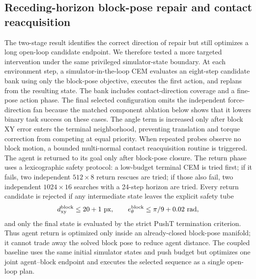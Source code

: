\documentclass{article}
\begin{document}
\subsection{Receding-horizon block-pose repair and contact reacquisition}
\label{sec:supp-receding-block-pose-repair}

The two-stage result identifies the correct direction of repair but still
optimizes a long open-loop candidate endpoint.  We therefore tested a more
targeted intervention under the same privileged simulator-state boundary.  At
each environment step, a simulator-in-the-loop CEM evaluates an eight-step
candidate bank using only the block-pose objective, executes the first action,
and replans from the resulting state.  The bank includes contact-direction
coverage and a fine-pose action phase.  The final selected configuration omits
the independent force-direction fan because the matched component ablation
below shows that it lowers binary task success on these cases.  The angle term
is increased only after block XY error enters the terminal neighborhood,
preventing translation and torque correction from competing at equal priority.
When repeated probes observe no block motion, a bounded multi-normal contact
reacquisition routine is triggered.
The agent is returned to its goal only after block-pose closure.  The return
phase uses a lexicographic safety protocol: a low-budget terminal CEM is tried
first; if it fails, two independent $512\times8$ return rescues are tried;
if those also fail, two independent $1024\times16$ searches with a 24-step
horizon are tried.  Every return candidate is rejected if any intermediate
state leaves the explicit safety tube
\begin{equation}
 d_{\mathrm{xy}}^{\mathrm{block}}\le 20+1\ {\rm px},\qquad
 e_{\theta}^{\mathrm{block}}\le \pi/9+0.02\ {\rm rad},
\label{eq:supp-return-safety-tube}
\end{equation}
and only the final state is evaluated by the strict PushT termination
criterion.  Thus agent return is optimized only inside an already-closed
block-pose manifold; it cannot trade away the solved block pose to reduce
agent distance.  The coupled baseline uses the same initial simulator states
and push budget but optimizes one joint agent--block endpoint and executes the
selected sequence as a single open-loop plan.
\end{document}
